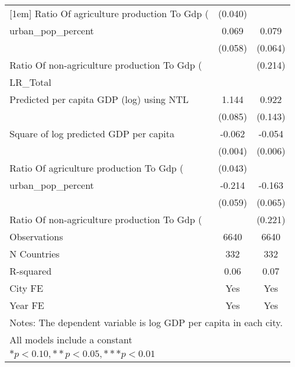 {\begin{tabular}{l*{2}{c}}
[1em]
Ratio Of agriculture production To Gdp (%
                    &     (0.040)         &                     \\
[1em]
urban\_pop\_percent   &       0.069         &       0.079         \\
                    &     (0.058)         &     (0.064)         \\
[1em]
Ratio Of non-agriculture production To Gdp (%
                    &                     &     (0.214)         \\
\hline
LR\_Total            &                     &                     \\
Predicted per capita GDP (log) using NTL&       1.144\sym{***}&       0.922\sym{***}\\
                    &     (0.085)         &     (0.143)         \\
[1em]
Square of log predicted GDP per capita&      -0.062\sym{***}&      -0.054\sym{***}\\
                    &     (0.004)         &     (0.006)         \\
[1em]
Ratio Of agriculture production To Gdp (%
                    &     (0.043)         &                     \\
[1em]
urban\_pop\_percent   &      -0.214\sym{***}&      -0.163\sym{**} \\
                    &     (0.059)         &     (0.065)         \\
[1em]
Ratio Of non-agriculture production To Gdp (%
                    &                     &     (0.221)         \\
\hline
Observations        &        6640         &        6640         \\
N Countries         &         332         &         332         \\
R-squared           &        0.06         &        0.07         \\
City FE             &         Yes         &         Yes         \\
Year FE             &         Yes         &         Yes         \\
\hline\hline
\multicolumn{3}{l}{\footnotesize Notes: The dependent variable is log GDP per capita in each city.}\\
\multicolumn{3}{l}{\footnotesize All models include a constant}\\
\multicolumn{3}{l}{\footnotesize $* p<0.10, ** p<0.05, *** p<0.01$}\\
\end{tabular}
}
